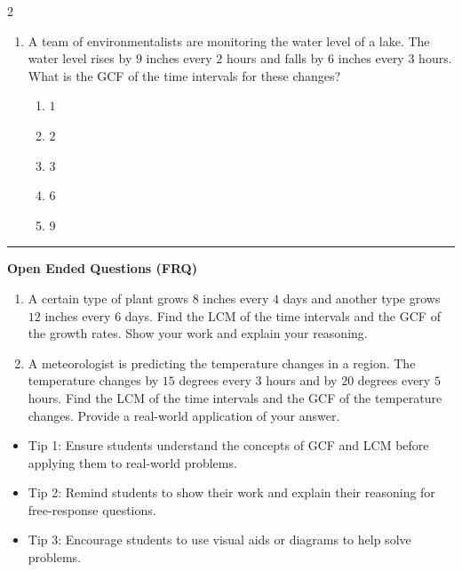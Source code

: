 \documentclass[10pt]{article}
\begin{document}
\begin{multicols}{2}
\begin{enumerate}[label=\textbf{Q\arabic*.}, leftmargin=*, itemsep=6pt, parsep=0pt]
  \item \small A team of environmentalists are monitoring the water level of a lake. The water level rises by $9$ inches every $2$ hours and falls by $6$ inches every $3$ hours. What is the GCF of the time intervals for these changes?
  \begin{enumerate}[label=(\Alph*), leftmargin=0.6cm, nosep, itemsep=2pt]
    \item $1$
    \item $2$
    \item $3$
    \item $6$
    \item $9$
  \end{enumerate}

\end{enumerate}
\end{multicols}

\vspace{-0.2cm}
\hrule
\vspace{0.2cm}
\textbf{\small Open Ended Questions (FRQ)}
\begin{enumerate}[label=\textbf{Q\arabic*.}, start=9, itemsep=5pt, topsep=0pt]

  \item \small A certain type of plant grows $8$ inches every $4$ days and another type grows $12$ inches every $6$ days. Find the LCM of the time intervals and the GCF of the growth rates. Show your work and explain your reasoning. \vspace{2cm}

  \item \small A meteorologist is predicting the temperature changes in a region. The temperature changes by $15$ degrees every $3$ hours and by $20$ degrees every $5$ hours. Find the LCM of the time intervals and the GCF of the temperature changes. Provide a real-world application of your answer. \vspace{2cm}

\end{enumerate}

\vfill

\begin{tcolorbox}[colback=blue!5, colframe=mainblue!50, title=\small \textbf{Chef's Tips}, fonttitle=\bfseries, bottom=1mm]
\begin{itemize}[noitemsep, topsep=2pt, leftmargin=0.5cm]
  \item \scriptsize Tip 1: Ensure students understand the concepts of GCF and LCM before applying them to real-world problems.\item \scriptsize Tip 2: Remind students to show their work and explain their reasoning for free-response questions.\item \scriptsize Tip 3: Encourage students to use visual aids or diagrams to help solve problems.
\end{itemize}
\end{tcolorbox}
\end{document}
